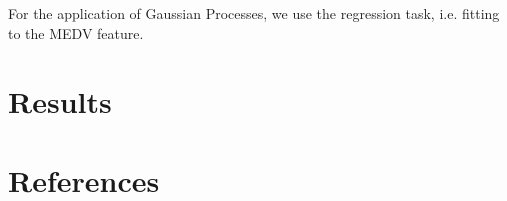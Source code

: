 \documentclass{article}
\begin{document}
For the application of Gaussian Processes, we use the regression task, i.e. fitting to the MEDV feature.

\section{Results}

\section*{References}

\medskip

\small


\end{document}
